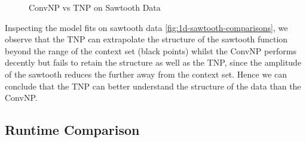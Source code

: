 \documentclass[../../main.tex]{subfiles}
\begin{document}
\begin{figure}[H]
	\centering
	\qquad
	\caption{ConvNP vs TNP on Sawtooth Data}
	\label{fig:1d-sawtooth-comparisons}
\end{figure}

Inspecting the model fits on sawtooth data \autoref{fig:1d-sawtooth-comparisons}, we observe that the TNP can extrapolate the structure of the sawtooth function beyond the range of the context set (black points) whilst the ConvNP performs decently but fails to retain the structure as well as the TNP, since the amplitude of the sawtooth reduces the further away from the context set. Hence we can conclude that the TNP can better understand the structure of the data than the ConvNP.

\subsection{Runtime Comparison}




\ifSubfilesClassLoaded{%
    \printbibliography{}
}{} 
\end{document}
